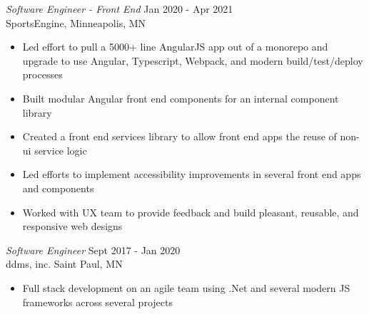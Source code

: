 \documentclass[margin]{res}
\begin{document}
\begin{resume}
    {\sl Software Engineer - Front End} \hfill Jan 2020 - Apr 2021 \\
    SportsEngine,
	Minneapolis, MN

	\begin{itemize}  \itemsep -2pt
	    \item Led effort to pull a 5000+ line AngularJS app out of a monorepo and upgrade to use Angular, Typescript, Webpack, and modern build/test/deploy processes
		\item Built modular Angular front end components for an internal component library
		\item Created a front end services library to allow front end apps the reuse of non-ui service logic
		\item Led efforts to implement accessibility improvements in several front end apps and components
		\item Worked with UX team to provide feedback and build pleasant, reusable, and responsive web designs
	\end{itemize}

	{\sl Software Engineer} \hfill Sept 2017 - Jan 2020 \\
    ddms, inc.
    Saint Paul, MN
    \begin{itemize}  \itemsep -2pt %
        \item Full stack development on an agile team using .Net and several modern JS frameworks across several projects
    \end{itemize}



\end{resume}
\end{document}

